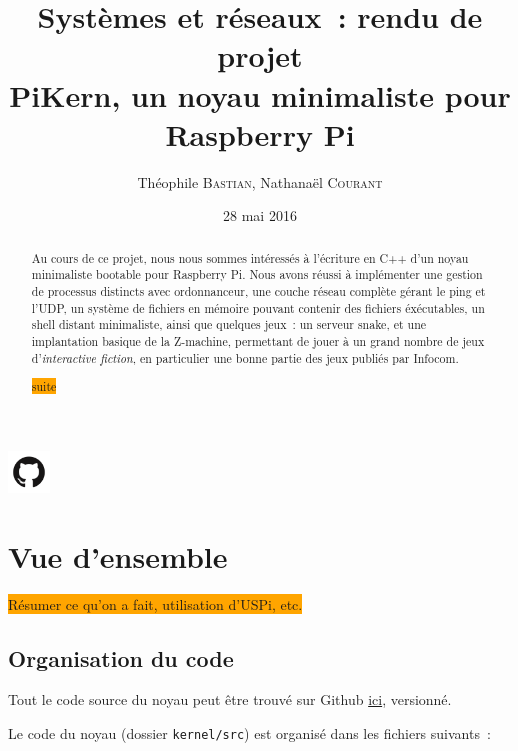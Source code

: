 \documentclass[11pt,a4paper]{article}
\author{Théophile \textsc{Bastian}, Nathanaël \textsc{Courant}}
\title{Systèmes et réseaux~: rendu de projet\\
{\small PiKern, un noyau minimaliste pour Raspberry Pi}}
\date{28 mai 2016}
\newcommand{\fname}[1]{\texttt{#1}} %
\newcommand{\todo}[1]{\colorbox{orange}{\color{blue}{\Large TODO:} #1}}
\begin{document}
\maketitle

\begin{abstract}
Au cours de ce projet, nous nous sommes intéressés à l'écriture en C++ d'un
noyau minimaliste bootable pour Raspberry Pi. Nous avons réussi à implémenter
une gestion de processus distincts avec ordonnanceur, une couche réseau
complète gérant le ping et l'UDP, un système de fichiers en mémoire
pouvant contenir des fichiers éxécutables, un shell distant
minimaliste, ainsi que quelques jeux~: un serveur snake, et une
implantation basique de la Z-machine, permettant de jouer à un grand
nombre de jeux d'\textit{interactive fiction}, en particulier une
bonne partie des jeux publiés par Infocom.

	\todo{suite}
\end{abstract}

\begin{center}
	\href{https://github.com/tobast/sysres-pikern}
		{\Large \includegraphics[height=3em]{github.png}
		}
\end{center}

\tableofcontents
\newpage

\section{Vue d'ensemble}

\todo{Résumer ce qu'on a fait, utilisation d'USPi, etc.}

\subsection{Organisation du code}

Tout le code source du noyau peut être trouvé sur Github
\href{https://github.com/tobast/sysres-pikern}{ici}, versionné.

Le code du noyau (dossier \fname{kernel/src}) est organisé dans les fichiers
suivants~:
\end{document}
